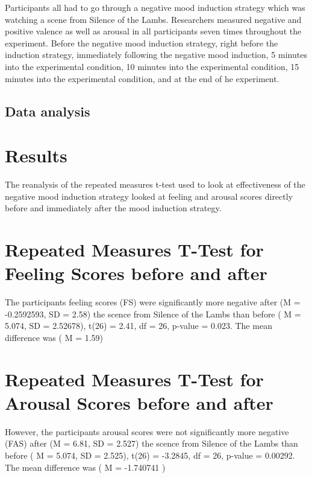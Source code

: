 \documentclass[
  english,
  man]{apa6}
\begin{document}
Participants all had to go through a negative mood induction strategy which was watching a scene from Silence of the Lambs. Researchers measured negative and positive valence as well as arousal in all participants seven times throughout the experiment. Before the negative mood induction strategy, right before the induction strategy, immediately following the negative mood induction, 5 minutes into the experimental condition, 10 minutes into the experimental condition, 15 minutes into the experimental condition, and at the end of he experiment.

\hypertarget{data-analysis}{%
\subsection{Data analysis}\label{data-analysis}}

\hypertarget{results}{%
\section{Results}\label{results}}

The reanalysis of the repeated measures t-test used to look at effectiveness of the negative mood induction strategy looked at feeling and arousal scores directly before and immediately after the mood induction strategy.

\hypertarget{repeated-measures-t-test-for-feeling-scores-before-and-after}{%
\section{Repeated Measures T-Test for Feeling Scores before and after}\label{repeated-measures-t-test-for-feeling-scores-before-and-after}}

The participants feeling scores (FS) were significantly more negative after (M = -0.2592593, SD = 2.58) the scence from Silence of the Lambs than before ( M = 5.074, SD = 2.52678), t(26) = 2.41, df = 26, p-value = 0.023. The mean difference was ( M = 1.59)

\hypertarget{repeated-measures-t-test-for-arousal-scores-before-and-after}{%
\section{Repeated Measures T-Test for Arousal Scores before and after}\label{repeated-measures-t-test-for-arousal-scores-before-and-after}}

However, the participants arousal scores were not significantly more negative (FAS) after (M = 6.81, SD = 2.527) the scence from Silence of the Lambs than before ( M = 5.074, SD = 2.525), t(26) = -3.2845, df = 26, p-value = 0.00292. The mean difference was ( M = -1.740741 )
\end{document}
